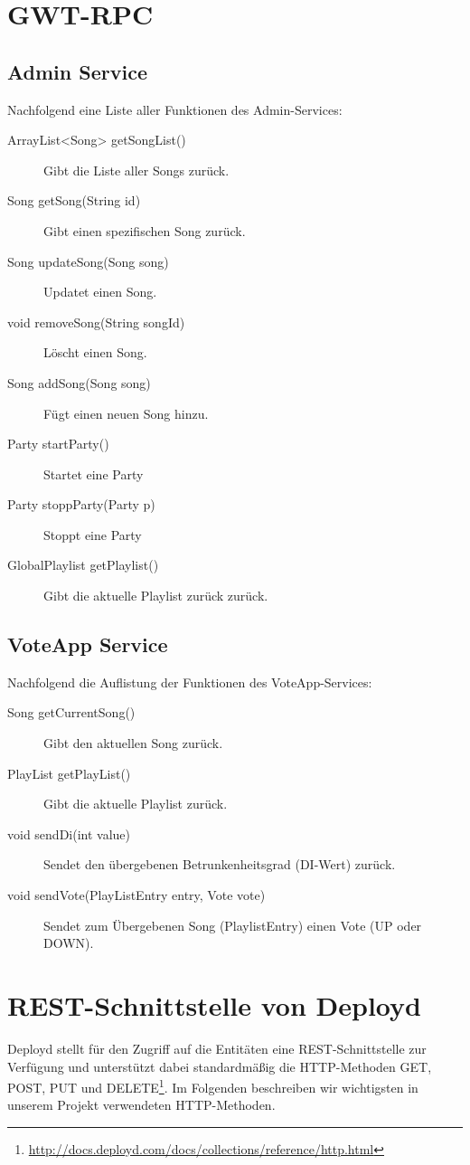 \section{GWT-RPC}

\subsection{Admin Service}
Nachfolgend eine Liste aller Funktionen des Admin-Services:
\begin{description}
	\item[ArrayList<Song> getSongList()] Gibt die Liste aller Songs zurück.
	\item[Song getSong(String id)] Gibt einen spezifischen Song zurück.
	\item[Song updateSong(Song song)] Updatet einen Song.
	\item[void removeSong(String songId)]	Löscht einen Song.
	\item[Song addSong(Song song)] Fügt einen neuen Song hinzu.
	\item[Party startParty()]	Startet eine Party
	\item[Party stoppParty(Party p)] Stoppt eine Party
	\item[GlobalPlaylist getPlaylist()] Gibt die aktuelle Playlist zurück zurück.
\end{description}


\subsection{VoteApp Service}
Nachfolgend die Auflistung der Funktionen des VoteApp-Services:
\begin{description}
	\item[Song getCurrentSong()] Gibt den aktuellen Song zurück.
	\item[PlayList getPlayList()]	Gibt die aktuelle Playlist zurück.
	\item[void sendDi(int value)] Sendet den übergebenen Betrunkenheitsgrad (DI-Wert) zurück.
	\item[void sendVote(PlayListEntry entry, Vote vote)] Sendet zum Übergebenen Song (PlaylistEntry) einen Vote (UP oder DOWN).
\end{description}

\section{REST-Schnittstelle von Deployd}
Deployd stellt für den Zugriff auf die Entitäten eine REST-Schnittstelle zur Verfügung und unterstützt dabei standardmäßig die HTTP-Methoden GET, POST, PUT und DELETE\footnote{\url{http://docs.deployd.com/docs/collections/reference/http.html}}. Im Folgenden beschreiben wir wichtigsten in unserem Projekt verwendeten HTTP-Methoden.

